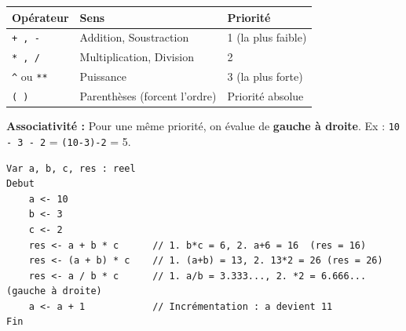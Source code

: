 \documentclass[11pt]{article}
\begin{document}
\begin{propriete}
\begin{center}
\begin{tabularx}{\linewidth}{|l|l|X|}
\hline
\rowcolor{popblueL} \textbf{Opérateur} & \textbf{Sens} & \textbf{Priorité} \\
\hline
\texttt{+ , -} & Addition, Soustraction & 1 (la plus faible) \\
\hline
\texttt{* , /} & Multiplication, Division & 2 \\
\hline
\texttt{\^{}} ou \texttt{**} & Puissance & 3 (la plus forte) \\
\hline
\texttt{( )} & Parenthèses (forcent l'ordre) & Priorité absolue \\
\hline
\end{tabularx}
\end{center}
\textbf{Associativité :} Pour une même priorité, on évalue de \textbf{gauche à droite}. Ex : \texttt{10 - 3 - 2} = \texttt{(10-3)-2} = 5.
\end{propriete}

\begin{exemplebox}
\begin{lstlisting}
Var a, b, c, res : reel
Debut
    a <- 10
    b <- 3
    c <- 2
    res <- a + b * c      // 1. b*c = 6, 2. a+6 = 16  (res = 16)
    res <- (a + b) * c    // 1. (a+b) = 13, 2. 13*2 = 26 (res = 26)
    res <- a / b * c      // 1. a/b = 3.333..., 2. *2 = 6.666... (gauche à droite)
    a <- a + 1            // Incrémentation : a devient 11
Fin
\end{lstlisting}
\end{exemplebox}
\end{document}
